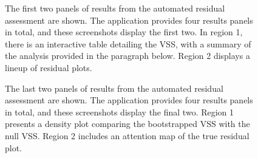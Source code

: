 \documentclass[
doublespace,
  times]{anzsauth}
\begin{document}
\begin{figure}


\caption{\label{fig-autovi-web-result}The first two panels of results
from the automated residual assessment are shown. The application
provides four results panels in total, and these screenshots display the
first two. In region 1, there is an interactive table detailing the VSS,
with a summary of the analysis provided in the paragraph below. Region 2
displays a lineup of residual plots.}

\end{figure}%

\begin{figure}


\caption{\label{fig-autovi-web-result2}The last two panels of results
from the automated residual assessment are shown. The application
provides four results panels in total, and these screenshots display the
final two. Region 1 presents a density plot comparing the bootstrapped
VSS with the null VSS. Region 2 includes an attention map of the true
residual plot.}

\end{figure}%
\end{document}

